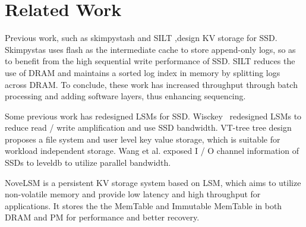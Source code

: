 \section{Related Work}

Previous work, such as skimpystash\cite{skimpystash} and SILT\cite{SILT} ,design KV storage for SSD. 
Skimpystas uses flash as the intermediate cache to store append-only logs, 
so as to benefit from the high sequential write performance of SSD. 
SILT reduces the use of DRAM and maintains a sorted log index in memory by splitting logs across DRAM.
To conclude, these work has increased throughput through batch processing and adding software layers, 
thus enhancing sequencing.

Some previous work has redesigned LSMs for SSD. Wisckey~\cite{WiscKey} redesigned LSMs to reduce read / write amplification and use SSD bandwidth. 
VT-tree\cite{VT-tree} tree design proposes a file system and user level key value storage, which is suitable for workload independent storage. Wang et al.\cite{Wang} exposed I / O channel information of SSDs to leveldb to utilize parallel bandwidth.

NoveLSM\cite{DBLP:conf/usenix/KannanBGAA18} is a persistent KV storage system based on LSM, which aims to utilize non-volatile memory and provide low latency and high throughput for applications. 
It stores the the MemTable and Immutable MemTable in both DRAM and PM for performance and better recovery. 
